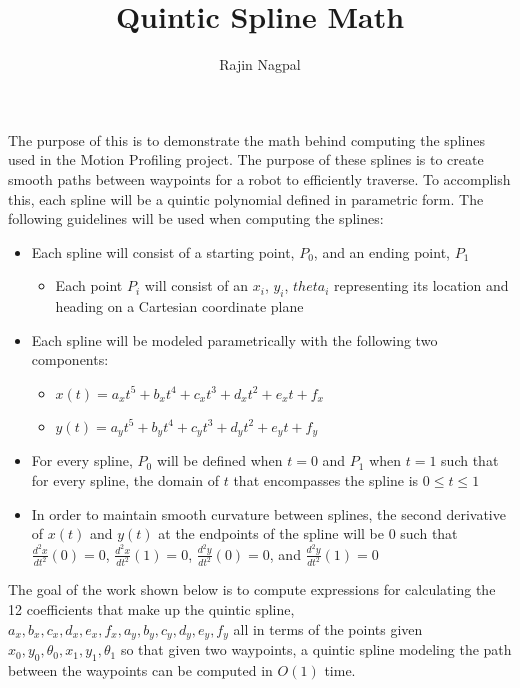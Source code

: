 \documentclass[12pt, letterpaper]{article}
\title{Quintic Spline Math}
\author{Rajin Nagpal}
\begin{document}
\maketitle

The purpose of this is to demonstrate the math behind computing the splines used in the Motion Profiling project. The purpose of these splines is to create smooth paths between waypoints for a robot to efficiently traverse. To accomplish this, each spline will be a quintic polynomial defined in parametric form. The following guidelines will be used when computing the splines: \begin{itemize}
\item Each spline will consist of a starting point, \(P_0\), and an ending point, \(P_1\) \begin{itemize}
\item Each point \(P_i\) will consist of an \(x_i\), \(y_i\), \(theta_i\) representing its location and heading on a Cartesian coordinate plane
\end{itemize}
\item Each spline will be modeled parametrically with the following two components: \begin{itemize}
\item \(x(t) = a_x t^5 + b_x t^4 + c_x t^3 + d_x t^2 + e_x t + f_x\)
\item \(y(t) = a_y t^5 + b_y t^4 + c_y t^3 + d_y t^2 + e_y t + f_y\)
\end{itemize}
\item For every spline, \(P_0\) will be defined when \(t = 0\) and \(P_1\) when \(t = 1\) such that for every spline, the domain of \(t\) that encompasses the spline is \(0 \leq t \leq 1\)
\item In order to maintain smooth curvature between splines, the second derivative of \(x(t)\) and \(y(t)\) at the endpoints of the spline will be \(0\) such that \(\frac{d^2x}{dt^2} (0) = 0\), \(\frac{d^2x}{dt^2} (1) = 0\), \(\frac{d^2y}{dt^2} (0) = 0\), and \(\frac{d^2y}{dt^2} (1) = 0\)
\end{itemize}

The goal of the work shown below is to compute expressions for calculating the 12 coefficients that make up the quintic spline, \(a_x, b_x, c_x, d_x, e_x, f_x, a_y, b_y, c_y, d_y, e_y, f_y\) all in terms of the points given \(x_0, y_0, \theta_0, x_1, y_1, \theta_1\) so that given two waypoints, a quintic spline modeling the path between the waypoints can be computed in \(O(1)\) time.
\end{document}
